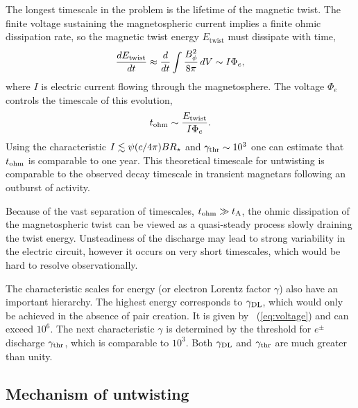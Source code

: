 The longest timescale in the problem is the lifetime of the magnetic twist.
The finite voltage sustaining the magnetospheric current implies a finite ohmic
dissipation rate, so the magnetic twist energy $E_\mathrm{twist}$ must dissipate with time,
\begin{equation}
  \label{eq:twist-dissipation}
  \frac{dE_{\rm twist}}{dt}
  \approx
  \frac{d}{dt}\int\frac{B_{\phi}^2}{8\pi} \, dV \sim I\Phi_{e},
\end{equation}
where $I$ is electric current flowing through the magnetosphere.
The voltage $\Phi_e$ controls the timescale of this evolution,
\begin{equation}
  t_{\rm ohm}\sim \frac{E_{\rm twist}}{I\Phi_{e}}.
\end{equation}
Using the characteristic $I\lesssim \psi (c/4\pi)BR_\star$ and $\gamma_{\rm thr}\sim 10^3$ one
can estimate that $t_{\rm ohm}$ is comparable to one year. This theoretical timescale for
untwisting is comparable to the observed decay timescale in transient
magnetars following an outburst of activity.

Because of the vast separation of timescales, $t_{\rm ohm}\gg t_{\rm A}$, the ohmic dissipation
of the magnetospheric twist can be viewed as a quasi-steady process
slowly draining the twist energy. Unsteadiness of the discharge may lead to
strong variability in the electric circuit, however
it occurs
on very short timescales, which
would be hard to resolve observationally.

The characteristic scales for energy (or electron Lorentz factor $\gamma$) also have
an important hierarchy. The highest energy corresponds to $\gamma_{\rm DL}$, which would only
be achieved in the absence of pair creation.
It
is given by \Eq~(\ref{eq:voltage})
and can
exceed $10^6$. The next characteristic $\gamma$ is determined by the threshold for
$e^\pm$ discharge $\gamma_{\rm thr}$, which is comparable to $10^3$. Both $\gamma_{\rm DL}$ and $\gamma_{\rm thr}$
are much greater than unity.

\subsection{Mechanism of untwisting}
\label{sec:twist-theory}

